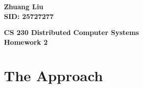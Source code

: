 \documentclass{article}%
\begin{document}
\begin{flushright}
\begin{LARGE}

\textbf{Zhuang Liu \\
SID: 25727277}
\end{LARGE}
\end{flushright}

\begin{center}
\begin{huge}
\textbf{CS 230 Distributed Computer Systems \\
Homework 2} \\
\end{huge}
\end{center}

\section{The Approach}
\end{document}
